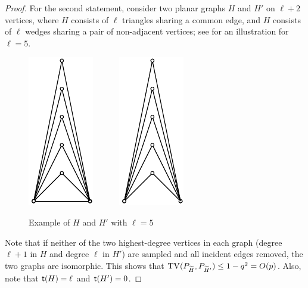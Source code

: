 \begin{proof}
For the second statement, consider two planar graphs $H$ and $H'$ on $\ell+2$ vertices, where $H$ consists of $\ell$ triangles sharing a common edge, and $H$ consists of $\ell$ wedges sharing a pair of non-adjacent vertices; see  for an illustration for $\ell=5$.
\begin{figure}[ht]%
\centering
\includegraphics[width=0.1\columnwidth]{graphs/Hplanartriangle.pdf}%
~~~~~
	\includegraphics[width=.1\columnwidth]{graphs/Hpplanartriangle.pdf}
	\caption{Example of $H$ and $ H' $ with $ \ell = 5 $}%
	\label{fig:trianglewedge}
\end{figure}
Note that if neither of the two highest-degree vertices in each graph (degree $ \ell+1 $ in $ H $ and degree $ \ell $ in $ H' $) are sampled and all incident edges removed, the two graphs are isomorphic. This shows that $ {\rm TV}(P_{{\widetilde{H}}}, P_{{\widetilde{H}}'}) \leq 1-q^2 = O(p) $. Also, note that $ {\mathsf{t}}(H)=\ell$ and ${\mathsf{t}}(H') = 0$.
\end{proof}

